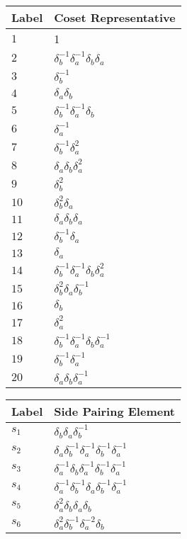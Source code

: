\documentclass{article}
\begin{document}
\begin{center}
\begin{tabular}{ll}
\toprule
Label & Coset Representative\\
\midrule
$1$ & 1 \\
$2$ & $\delta_b^{-1}\delta_a^{-1}\delta_b^{}\delta_a^{}$ \\
$3$ & $\delta_b^{-1}$ \\
$4$ & $\delta_a^{}\delta_b^{}$ \\
$5$ & $\delta_b^{-1}\delta_a^{-1}\delta_b^{}$ \\
$6$ & $\delta_a^{-1}$ \\
$7$ & $\delta_b^{-1}\delta_a^{2}$ \\
$8$ & $\delta_a^{}\delta_b^{}\delta_a^{2}$ \\
$9$ & $\delta_b^{2}$ \\
$10$ & $\delta_b^{2}\delta_a^{}$ \\
$11$ & $\delta_a^{}\delta_b^{}\delta_a^{}$ \\
$12$ & $\delta_b^{-1}\delta_a^{}$ \\
$13$ & $\delta_a^{}$ \\
$14$ & $\delta_b^{-1}\delta_a^{-1}\delta_b^{}\delta_a^{2}$ \\
$15$ & $\delta_b^{2}\delta_a^{}\delta_b^{-1}$ \\
$16$ & $\delta_b^{}$ \\
$17$ & $\delta_a^{2}$ \\
$18$ & $\delta_b^{-1}\delta_a^{-1}\delta_b^{}\delta_a^{-1}$ \\
$19$ & $\delta_b^{-1}\delta_a^{-1}$ \\
$20$ & $\delta_a^{}\delta_b^{}\delta_a^{-1}$ \\
\bottomrule
\end{tabular}
\hfill
\begin{tabular}{ll}
\toprule
Label & Side Pairing Element\\
\midrule
$s_{1}$ & $\delta_b^{}\delta_a^{}\delta_b^{-1}$ \\
$s_{2}$ & $\delta_a^{}\delta_b^{-1}\delta_a^{-1}\delta_b^{-1}\delta_a^{-1}$ \\
$s_{3}$ & $\delta_a^{-1}\delta_b^{}\delta_a^{-1}\delta_b^{-1}\delta_a^{-1}$ \\
$s_{4}$ & $\delta_a^{-1}\delta_b^{-1}\delta_a^{}\delta_b^{-1}\delta_a^{-1}$ \\
$s_{5}$ & $\delta_a^{2}\delta_b^{}\delta_a^{}\delta_b^{}$ \\
$s_{6}$ & $\delta_a^{2}\delta_b^{-1}\delta_a^{-2}\delta_b^{}$ \\

\end{tabular}
\end{center}
\end{document}

